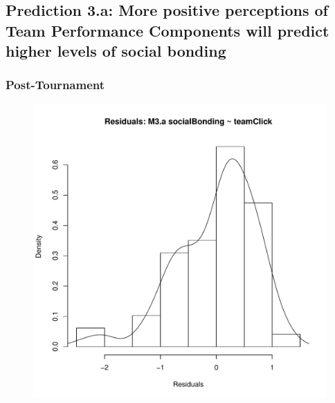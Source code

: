       \subsection{Prediction 3.a: More positive perceptions of Team Performance Components will predict higher levels of social bonding}

      \subsubsection{Post-Tournament}

          


      \begin{figure}[htbp]
        \includegraphics[scale =.4]{images/MLM3aHist.pdf}

\end{figure}
